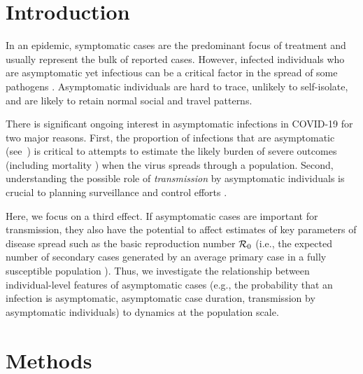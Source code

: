 \section{Introduction}

In an epidemic, symptomatic cases are the predominant focus of treatment and usually represent the bulk of reported cases. 
However, infected individuals who are asymptomatic yet infectious can be a critical factor in the spread of some pathogens \citep{fraser2004factors}.
Asymptomatic individuals are hard to trace, unlikely to self-isolate, and are likely to retain normal social and travel patterns.

There is significant ongoing interest in asymptomatic infections in COVID-19 for two major reasons. 
First, the proportion of infections that are asymptomatic (see~\citep{mizumoto_2020}) is critical to attempts to estimate the likely burden of severe outcomes (including mortality \citep{fauci_nejm2020}) when the virus spreads through a population.
Second, understanding the possible role of \emph{transmission} by asymptomatic individuals is crucial to planning surveillance and control efforts \citep{fraser2004factors, bai2020presumed}.

Here, we focus on a third effect. 
If asymptomatic cases are important for transmission, they also have the potential to affect estimates of key parameters of disease spread such as the basic reproduction number ${\cal{R}}_0$ (i.e., the expected number of secondary cases generated by an average primary case in a fully susceptible population \citep{anderson1992infectious}). 
Thus, we investigate the relationship between individual-level features of asymptomatic cases (e.g., the probability that an infection is asymptomatic, asymptomatic case duration, transmission by asymptomatic individuals) to dynamics at the population scale.

\section{Methods}

